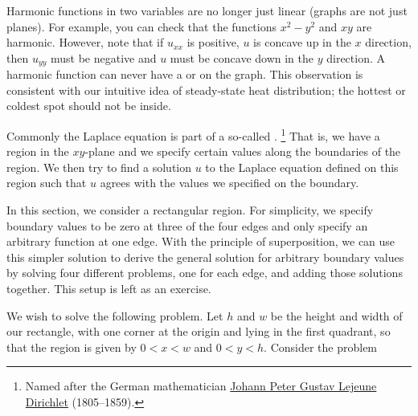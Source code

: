 Harmonic functions in two variables are no longer just linear
(graphs are not just planes).  For example, you can check that the functions
$x^2-y^2$ and $xy$ are harmonic.  However, note that if $u_{xx}$ is positive, $u$ is concave
up in the $x$ direction, then $u_{yy}$ must be negative and $u$ must be
concave down in the $y$ direction.  A harmonic function can never
have a  or  on the graph.  This observation is
consistent with our intuitive idea of steady-state heat distribution;
the hottest or coldest spot should not be inside.

Commonly the Laplace equation is part of a so-called
\emph{}.%
\footnote{Named after the German mathematician
\href{https://en.wikipedia.org/wiki/Dirichlet}{Johann Peter Gustav Lejeune Dirichlet}
(1805--1859).}
That
is, we have a region in the $xy$-plane and we specify certain values along
the boundaries of the region.  We then try to find a solution $u$ to the
Laplace equation defined on
this region such that $u$ agrees with the values we specified on the
boundary.

In this section, we consider a rectangular region.  For simplicity,
we specify boundary values to be zero at three of the four edges and only
specify an arbitrary function at one edge.
With the principle of superposition, we can use this simpler
solution to derive the general
solution for arbitrary boundary values by solving four different problems,
one for each edge, and adding those solutions together.
This setup is left as an exercise.

We wish to solve the following problem.  Let $h$ and $w$
be the height and width of our rectangle, with one corner at the origin and
lying in the first quadrant, so that the region is
given by $0 < x < w$ and $0 < y < h$.
Consider the problem


